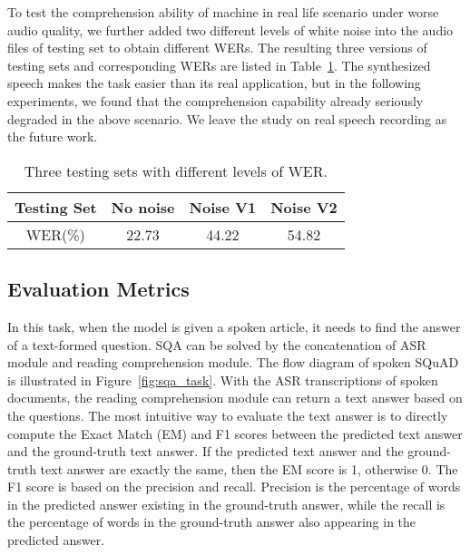 \documentclass[a4paper]{article}
\begin{document}
To test the comprehension ability of machine in real life scenario under worse audio quality, we further added two different levels of white noise into the audio files of testing set to obtain different WERs.
The resulting three versions of testing sets and corresponding WERs are listed in Table~\ref{tab:WER}.
The synthesized speech  makes the task easier than its real application, but in the following experiments, we found that the comprehension capability already seriously degraded in the above scenario.
We leave the study on real speech recording as the future work.







\begin{table}[]
\centering
\caption{Three  testing sets with different levels of WER.}
\label{tab:WER}
\begin{tabular}{|c|c|c|c|}
 \hline
 \textbf{Testing Set} &  \textbf{No noise} &\textbf{Noise V1 }&\textbf{Noise V2}\\
 \hline
 \hline
 WER(\%) & 22.73 & 44.22 & 54.82 \\

\hline
\end{tabular}
\end{table}

\subsection{Evaluation  Metrics} 
In this task, when the model is given a spoken article, it needs to find the answer of a text-formed  question. 
SQA can be solved by the concatenation of ASR module and reading comprehension module.
The flow diagram of spoken SQuAD is illustrated in Figure~\ref{fig:sqa_task}.
With the ASR transcriptions of spoken documents, the reading comprehension module can return a text answer based on the questions.
The most intuitive way to evaluate the text answer is to directly compute the Exact Match (EM) and F1 scores between the predicted text answer and the ground-truth text answer.
If the predicted text answer and the ground-truth text answer are exactly the same, then the EM score is 1, otherwise 0. The F1 score is based on the precision and recall.
Precision   is the percentage of words in the predicted answer existing in the ground-truth answer, while the recall  is the percentage of words in the ground-truth answer also appearing in the predicted answer. 
\end{document}
